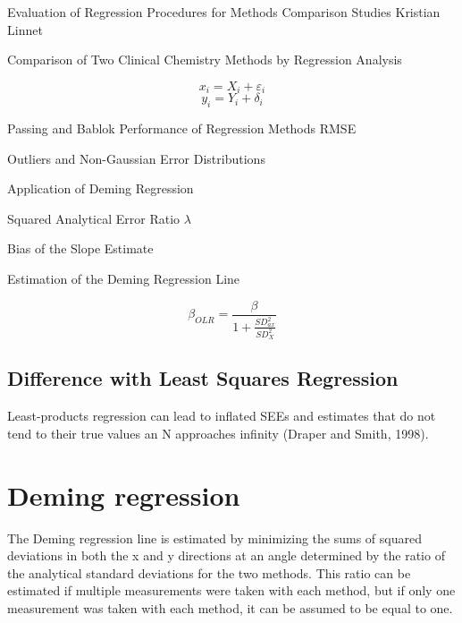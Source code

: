 \documentclass[MAIN.tex]{subfiles}
\begin{document}
Evaluation of Regression Procedures for Methods Comparison Studies
Kristian Linnet

Comparison of Two Clinical Chemistry Methods by Regression Analysis

\[ x_i = X_i + \varepsilon_i \]
\[ y_i = Y_i + \delta_i \]




Passing and Bablok
Performance of Regression Methods
RMSE

Outliers and Non-Gaussian Error Distributions


Application of Deming Regression


Squared Analytical Error Ratio $\lambda$

Bias of the Slope Estimate

Estimation of the Deming Regression Line

\[ \beta_{OLR} =  \frac{\beta}{1 + \frac{SD^2_{ax}}{SD^2_{X}}}\]
\newpage


\subsection{Difference with Least Squares Regression}
Least-products regression can lead to inflated SEEs and estimates
that do not tend to their true values an N approaches infinity
(Draper and Smith, 1998).
	
\section*{Deming regression}
The Deming regression line is estimated by minimizing the sums of squared deviations in both the x and y directions at an angle determined by the ratio of the analytical standard deviations for the two methods.
This ratio can be estimated if multiple measurements were taken with each method, but if only one measurement was taken with each method, it can be assumed to be equal to one.
	
\end{document}
